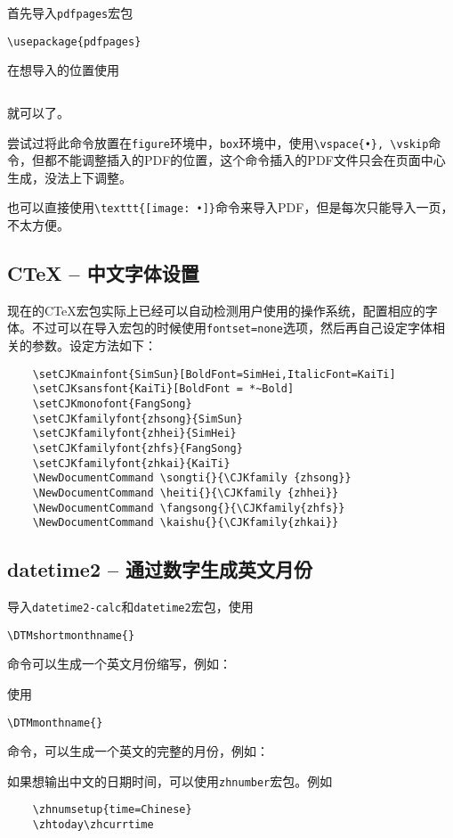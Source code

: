首先导入\lstinline|pdfpages|宏包
\begin{lstlisting}
\usepackage{pdfpages}
\end{lstlisting}
在想导入的位置使用
\begin{lstlisting}

\end{lstlisting}
就可以了。

尝试过将此命令放置在\lstinline|figure|环境中，\lstinline|box|环境中，使用\lstinline|\vspace{•}, \vskip|命令，但都不能调整插入的PDF的位置，这个命令插入的PDF文件只会在页面中心生成，没法上下调整。

也可以直接使用\lstinline|\texttt{[image: •]}|命令来导入PDF，但是每次只能导入一页，不太方便。

\subsection{CTeX -- 中文字体设置}
现在的CTeX宏包实际上已经可以自动检测用户使用的操作系统，配置相应的字体。不过可以在导入宏包的时候使用\lstinline|fontset=none|选项，然后再自己设定字体相关的参数。设定方法如下：
\begin{lstlisting}
	\setCJKmainfont{SimSun}[BoldFont=SimHei,ItalicFont=KaiTi]
	\setCJKsansfont{KaiTi}[BoldFont = *~Bold]
	\setCJKmonofont{FangSong}
	\setCJKfamilyfont{zhsong}{SimSun}
	\setCJKfamilyfont{zhhei}{SimHei}
	\setCJKfamilyfont{zhfs}{FangSong}
	\setCJKfamilyfont{zhkai}{KaiTi}
	\NewDocumentCommand \songti{}{\CJKfamily {zhsong}}
	\NewDocumentCommand \heiti{}{\CJKfamily {zhhei}}
	\NewDocumentCommand \fangsong{}{\CJKfamily{zhfs}}
	\NewDocumentCommand \kaishu{}{\CJKfamily{zhkai}}
\end{lstlisting}

\subsection{datetime2 -- 通过数字生成英文月份}
导入\lstinline|datetime2-calc|和\lstinline|datetime2|宏包，使用
\begin{lstlisting}
\DTMshortmonthname{}
\end{lstlisting}
命令可以生成一个英文月份缩写，例如：

使用\begin{lstlisting}
\DTMmonthname{}
\end{lstlisting}
命令，可以生成一个英文的完整的月份，例如：

如果想输出中文的日期时间，可以使用\lstinline|zhnumber|宏包。例如
\begin{lstlisting}
	\zhnumsetup{time=Chinese}
	\zhtoday\zhcurrtime
\end{lstlisting}

